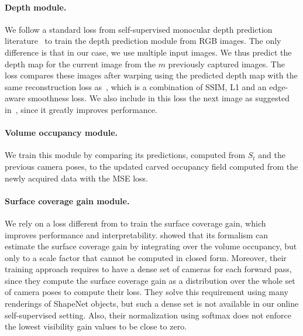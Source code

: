 \paragraph{Depth module.} We follow a standard loss from self-supervised monocular depth prediction literature~\cite{watson-cvpr21-temporal-opportunist-manydepth,godard-iccv19-digginginto,godard-cvpr17-unsupervisedmonoculardepth} to train the depth prediction module from RGB images. The only difference is that in our case, we use multiple input images. We thus predict the depth map for the current image from the $m$ previously captured images. The loss compares these images after warping using the predicted depth map with the same reconstruction loss as~\cite{watson-cvpr21-temporal-opportunist-manydepth,godard-iccv19-digginginto,godard-cvpr17-unsupervisedmonoculardepth}, which is a combination of SSIM, L1 and an edge-aware smoothness loss. We also include in this loss the next image as suggested in~\cite{watson-cvpr21-temporal-opportunist-manydepth}, since it greatly improves performance.

\paragraph{Volume occupancy module.}

We train this module by comparing its predictions, computed from $S_t$ and the previous camera poses, to the updated carved occupancy field computed from the newly acquired data with the MSE loss. 

\paragraph{Surface coverage gain module.}

We rely on a loss different from \cite{guedon-nips22-scone-surface-coverage} to train the surface coverage gain, which improves performance and interpretability.
%
\cite{guedon-nips22-scone-surface-coverage} showed that its formalism can estimate the surface coverage gain by integrating over the volume occupancy, but only to a scale factor that cannot be computed in closed form. Moreover, their training approach requires to have a dense set of cameras for each forward pass, since they compute the surface coverage gain as a distribution over the whole set of camera poses to compute their loss. They solve this requirement using many renderings of ShapeNet objects, but such a dense set is not available in our online self-supervised setting. Also, their normalization using softmax does not enforce the lowest visibility gain values to be close to zero.

